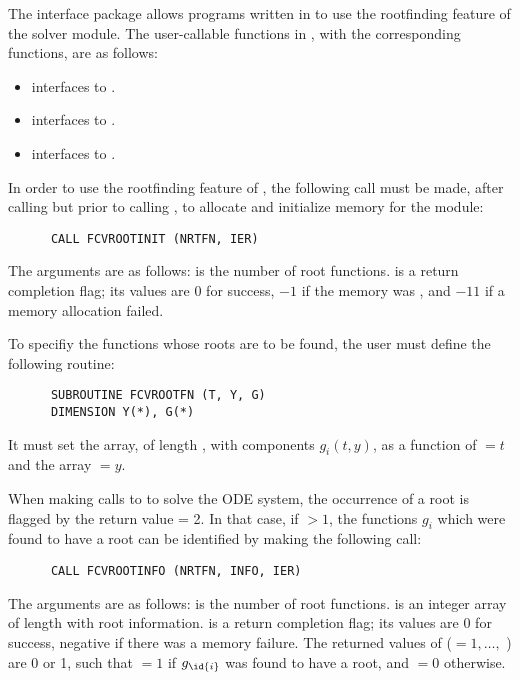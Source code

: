 The {\fcvroot} interface package allows programs written in {\F} to
use the rootfinding feature of the {\cvode} solver module.
The user-callable functions in {\fcvroot}, with the corresponding
{\cvode} functions, are as follows: 
\begin{itemize}
  \item {} interfaces to .
  \item {} interfaces to .
  \item {} interfaces to .
\end{itemize}
In order to use the rootfinding feature of {\cvode}, the following
call must be made, after calling  but prior to calling
, to allocate and initialize memory for the  module:
\begin{verbatim}
      CALL FCVROOTINIT (NRTFN, IER)
\end{verbatim}
The arguments are as follows:
 is the number of root functions.
 is a return completion flag; its values are $0$ for success, $-1$ 
if the  memory was , and $-11$ if a memory allocation failed.

To specifiy the functions whose roots are to be found, the user must
define the following routine:
\begin{verbatim}
      SUBROUTINE FCVROOTFN (T, Y, G)
      DIMENSION Y(*), G(*)
\end{verbatim}
It must set the  array, of length , with components $g_i(t,y)$,
as a function of $=t$ and the array $=y$.  

When making calls to  to solve the ODE system, the occurrence of
a root is flagged by the return value  = 2.  In that case, if
 $> 1$, the functions $g_i$ which were found to have a root can
be identified by making the following call:
\begin{verbatim}
      CALL FCVROOTINFO (NRTFN, INFO, IER)
\end{verbatim}
The arguments are as follows:  is the number of root functions.
 is an integer array of length  with root information.
 is a return completion flag; its values are $0$ for success, 
negative if there was a memory failure.  The returned values of 
($ = 1,\ldots,$ ) are 0 or 1, such that  $ = 1$
if $g_{\id{i}}$ was found to have a root, and  $ = 0$ otherwise.

